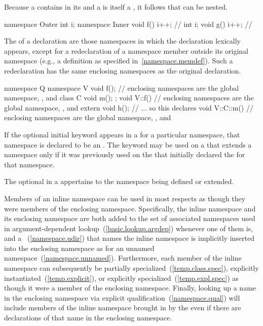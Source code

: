 \pnum
Because a  contains
 in its  and a
 is itself a , it
follows that  can be nested.
\enterexample

\begin{codeblock}
namespace Outer {
  int i;
  namespace Inner {
    void f() { i++; }           // 
    int i;
    void g() { i++; }           // 
  }
}
\end{codeblock}
\exitexample

\pnum
The  of a declaration are those
namespaces in which the declaration lexically appears, except for a
redeclaration of a namespace member outside its original namespace
(e.g., a definition as specified in~\ref{namespace.memdef}). Such a
redeclaration has the same enclosing namespaces as the original
declaration.
\enterexample
\begin{codeblock}
namespace Q {
  namespace V {
    void f();   // enclosing namespaces are the global namespace, , and 
    class C { void m(); };
  }
  void V::f() { // enclosing namespaces are the global namespace, , and 
    extern void h();  // ... so this declares 
  }
  void V::C::m() { // enclosing namespaces are the global namespace, , and 
  }
}
\end{codeblock}
\exitexample

\pnum
If the optional initial  keyword appears in a
 for a particular namespace, that namespace is
declared to be an . The  keyword may be
used on a  that extends a namespace
only if it was previously used on the  
that initially declared the  for that namespace.

\pnum
The optional 
in a 
appertains to the namespace being defined or extended.

\pnum
Members of an inline namespace can be used in most respects as though they were members
of the enclosing namespace. Specifically, the inline namespace and its enclosing
namespace are both added to the set of associated namespaces used in
argument-dependent lookup~(\ref{basic.lookup.argdep}) whenever one of them is,
and a ~(\ref{namespace.udir}) that names the inline
namespace is implicitly inserted into the enclosing namespace as for an unnamed
namespace~(\ref{namespace.unnamed}). Furthermore, each
member of the inline namespace can subsequently be partially
specialized~(\ref{temp.class.spec}), explicitly
instantiated~(\ref{temp.explicit}), or explicitly specialized~(\ref{temp.expl.spec}) as
though it were a member of the enclosing namespace. Finally, looking up a name in the
enclosing namespace via explicit qualification~(\ref{namespace.qual}) will include
members of the inline namespace brought in by the  even if
there are declarations of that name in the enclosing namespace.

